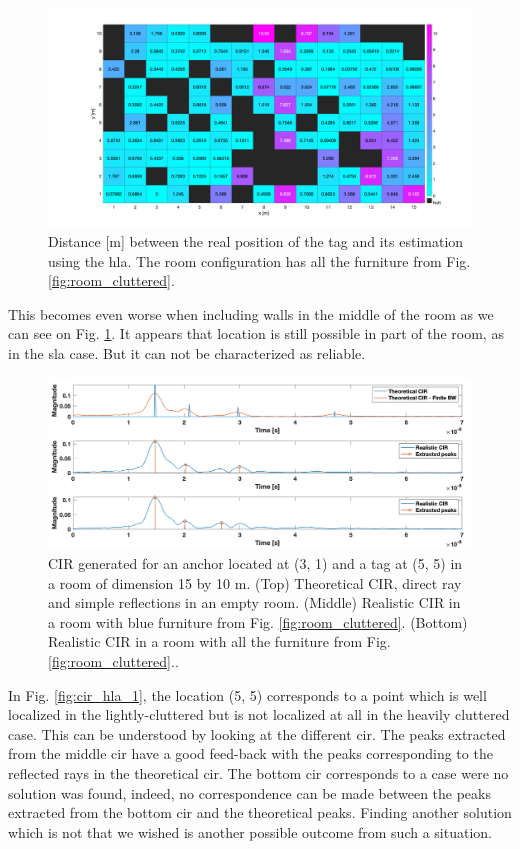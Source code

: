\begin{figure}[H]
\centering
\includegraphics[width=.9\linewidth]{Images/hla_images/really_clut_(3_1).png}
\caption{Distance [m] between the real position of the tag and its estimation using the \gls{hla}. The room configuration has all the furniture from Fig. \ref{fig:room_cluttered}.\label{fig:hla_really_clut}}
\end{figure}

This becomes even worse when including walls in the middle of the room as we can see on Fig. \ref{fig:hla_really_clut}. It appears that location is still possible in part of the room,
as in the \gls{sla} case. But it can not be characterized as reliable.

\begin{figure}[H]
\centering
\includegraphics[width=.9\linewidth]{Images/hla_images/image_2.png}
\caption{CIR generated for an anchor located at (3, 1) and a tag at (5, 5) in a room of dimension 15 by 10 m. (Top) Theoretical CIR, direct ray and simple reflections in an empty room. (Middle) Realistic CIR in a room with blue furniture from Fig. \ref{fig:room_cluttered}. (Bottom) Realistic CIR in a room with all the furniture from Fig. \ref{fig:room_cluttered}.. \label{fig:cir_hla_2}}
\end{figure}

In Fig. \ref{fig:cir_hla_1}, the location (5, 5) corresponds to a point which is well localized in the lightly-cluttered but is not localized at all in the heavily cluttered case. This can be understood by looking at the different \gls{cir}. The peaks extracted from the middle \gls{cir} have a good feed-back with the peaks corresponding to the reflected rays in the theoretical \gls{cir}. The bottom \gls{cir} corresponds to a case were no solution was found, indeed, no correspondence can be made between the peaks extracted from the bottom \gls{cir} and the theoretical peaks. Finding another solution which is not that we wished is another possible outcome from such a situation.

